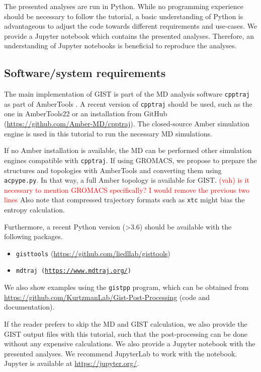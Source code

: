 \documentclass[9pt,tutorial]{livecoms}
\newcommand{\software}{\texttt}
\newcommand{\todo}{\textcolor{red}}
\newcommand\inlinecode{\texttt}
\begin{document}
The presented analyses are run in Python.
While no programming experience should be necessary to follow the tutorial, a basic understanding of Python is advantageous to adjust the code towards different requirements and use-cases. 
We provide a Jupyter notebook which contains the presented analyses. 
Therefore, an understanding of Jupyter notebooks is beneficial to reproduce the analyses.

\subsection{Software/system requirements}
The main implementation of GIST is part of the MD analysis software \software{cpptraj} as part of AmberTools \cite{amber22}.
A recent version of \software{cpptraj} should be used, such as the one in AmberTools22 or an installation from GitHub (\url{https://github.com/Amber-MD/cpptraj}).
The closed-source Amber simulation engine is used in this tutorial to run the necessary MD simulations. 

If no Amber installation is available, the MD can be performed other simulation engines compatible with \software{cpptraj}.
If using GROMACS, we propose to prepare the structures and topologies with AmberTools and converting them using \software{acpype.py}.
In that way, a full Amber topology is available for GIST. 
\todo{ (vah) is it necessary to mention GROMACS specifically? I would remove the previous two lines}
Also note that compressed trajectory formats such as \inlinecode{xtc} might bias the entropy calculation.

Furthermore, a recent Python version (>3.6) should be available with the following packages.
\begin{itemize}
	\item \software{gisttools} (\url{https://github.com/liedllab/gisttools})
	\item \software{mdtraj (\url{https://www.mdtraj.org/})}
\end{itemize}

We also show examples using the \software{gistpp} program, which can be obtained from \url{https://github.com/KurtzmanLab/Gist-Post-Processing} (code and documentation).

If the reader prefers to skip the MD and GIST calculation, we also provide the GIST output files with this tutorial, such that the post-processing can be done without any expensive calculations.
We also provide a Jupyter notebook \cite{Kluyver2016-jupyter,Granger2021-jupyter} with the presented analyses. 
We recommend JupyterLab to work with the notebook. Jupyter is available at \url{https://jupyter.org/}.
\end{document}
